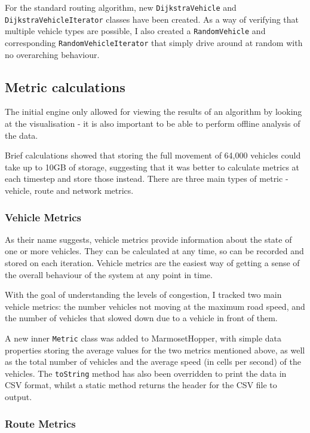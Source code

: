\documentclass[ %
                    author={Alexander Hill},
                supervisor={Dr. Benjamin Sach},
                    degree={MEng},
                     title={MARMOSET},
                  subtitle={Multi-Agent Route Management using Online Simulation for Efficient Transportation},
                      type={research},
                      year={2016} ]{dissertation}
\begin{document}
For the standard routing algorithm, new \texttt{DijkstraVehicle} and
\texttt{DijkstraVehicleIterator} classes have been created. As a way of
verifying that multiple vehicle types are possible, I also created a
\texttt{RandomVehicle} and corresponding \texttt{RandomVehicleIterator} that
simply drive around at random with no overarching behaviour.

\subsection{Metric calculations}

The initial engine only allowed for viewing the results of an algorithm by
looking at the visualisation - it is also important to be able to perform
offline analysis of the data.

Brief calculations showed that storing the full movement of 64,000 vehicles
could take up to 10GB of storage, suggesting that it was better to calculate
metrics at each timestep and store those instead. There are three main types of
metric - vehicle, route and network metrics.

\subsubsection{Vehicle Metrics}

As their name suggests, vehicle metrics provide information about the state of
one or more vehicles. They can be calculated at any time, so can be recorded and
stored on each iteration. Vehicle metrics are the easiest way of getting a sense
of the overall behaviour of the system at any point in time.

With the goal of understanding the levels of congestion, I tracked two main
vehicle metrics: the number vehicles not moving at the maximum road speed, and
the number of vehicles that slowed down due to a vehicle in front of them.

A new inner \texttt{Metric} class was added to MarmosetHopper, with simple data
properties storing the average values for the two metrics mentioned above, as
well as the total number of vehicles and the average speed (in cells per second)
of the vehicles. The \texttt{toString} method has also been overridden to print
the data in CSV format, whilst a static method returns the header for the CSV
file to output.

\subsubsection{Route Metrics}
\end{document}
